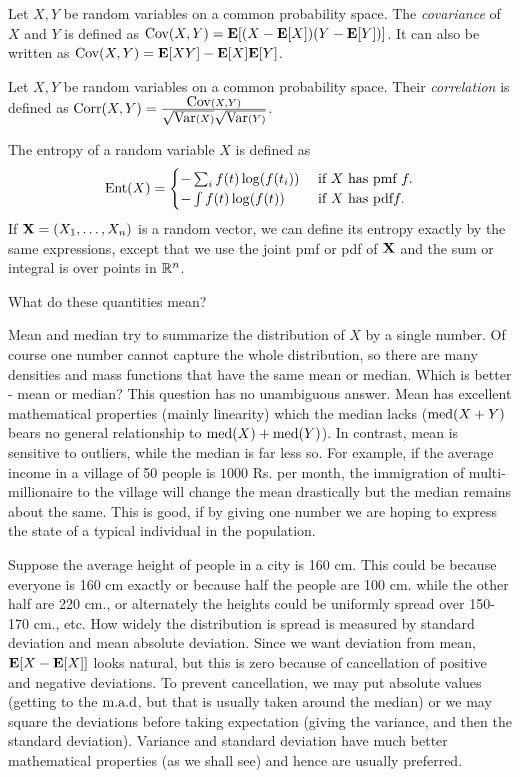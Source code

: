 \documentclass[preprint,  11pt]{amsart}
\def\X{{\bf X}}
\begin{document}
 Let $X,Y$ be random variables on a common probability space. The {\em covariance} of $X$ and $Y$ is defined as $\mbox{Cov}(X,Y)=\mathbf{E}[(X-\mathbf{E}[X])(Y-\mathbf{E}[Y])]$. It can also be written as $\mbox{Cov}(X,Y)=\mathbf{E}[XY]-\mathbf{E}[X]\mathbf{E}[Y]$.

 Let $X,Y$ be random variables on a common probability space. Their {\em correlation} is defined as $\mbox{Corr}(X,Y)=\frac{\mbox{Cov}(X,Y)}{\sqrt{\mbox{Var}(X)}\sqrt{\mbox{Var}(Y)}}$.

 The entropy of a random variable $X$ is defined as 
$$
\mbox{Ent}(X) = \begin{cases} -\sum_{i} f(t) \log(f(t_{i})) & \mbox{ if }X\mbox{ has pmf }f.\\
-\int\limits f(t) \log(f(t)) & \mbox{ if }X \mbox{ has pdf} f. \end{cases}
$$
If $\X=(X_{1},\ldots ,X_{n})$ is a random vector, we can define its entropy exactly by the same expressions, except that we use the joint pmf or pdf of $\X$ and the sum or integral is over points in $\mathbb{R}^{n}$.




 What do these quantities mean? 

 Mean and median  try to summarize the distribution of $X$ by a single number. Of course one number cannot capture the whole distribution, so there are many densities and mass functions that have the same mean or median. Which is better - mean or median? This question has no unambiguous answer. Mean has excellent mathematical properties (mainly linearity) which the median lacks ($\mbox{med}(X+Y)$ bears no general relationship to $\mbox{med}(X)+\mbox{med}(Y)$). In contrast, mean is sensitive to outliers, while the median is far less so. For example, if the average income in a village of 50 people is $1000$ Rs. per month, the immigration of multi-millionaire to the village will change the mean drastically but the median remains about the same. This is good, if by giving one number we are hoping to express the state of a typical individual in the population.

 Suppose the average height of people in a city is 160 cm. This could be because everyone is 160 cm exactly or because half the people are 100 cm. while the other half are 220 cm., or alternately the heights could be uniformly spread over 150-170 cm., etc. How widely the distribution is  spread is measured by standard deviation and mean absolute deviation. Since we want deviation from mean, $\mathbf{E}[X-\mathbf{E}[X]]$ looks natural, but this is zero because of cancellation of positive and negative deviations. To prevent cancellation, we may put absolute values (getting to the $\mbox{m.a.d}$, but that is usually taken around the median) or we may square the deviations before taking expectation (giving the variance, and then the standard deviation). Variance and standard deviation have much better mathematical properties (as we shall see) and hence are usually preferred.
\end{document}
